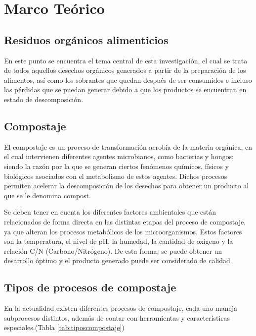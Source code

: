 \section{Marco Teórico}

\subsection{Residuos orgánicos alimenticios}

En este punto se encuentra el tema central de esta investigación, el cual se trata de todos aquellos desechos orgánicos generados a partir de la preparación de los alimentos, así como los sobrantes que quedan después de ser consumidos e incluso las pérdidas que se puedan generar debido a que los productos se encuentran en estado de descomposición. \cite{CCA2017}

\subsection{Compostaje}

El compostaje es un proceso de transformación aerobia de la materia orgánica, en el cual intervienen diferentes agentes microbianos, como bacterias y hongos; siendo la razón por la que se generan ciertos fenómenos químicos, físicos y biológicos asociados con el metabolismo de estos agentes. Dichos procesos permiten acelerar la descomposición de los desechos para obtener un producto al que se le denomina compost.

Se deben tener en cuenta los diferentes factores ambientales que están relacionados de forma directa en las distintas etapas del proceso de compostaje, ya que alteran los procesos metabólicos de los microorganismos. Estos factores son la temperatura, el nivel de pH, la humedad, la cantidad de oxígeno y la relación C/N (Carbono/Nitrógeno). De esta forma, se puede obtener un desarrollo óptimo y el producto generado puede ser considerado de calidad. \cite{WIL2019}

\subsection{Tipos de procesos de compostaje}

En la actualidad existen diferentes procesos de compostaje, cada uno maneja subprocesos distintos, además de contar con herramientas y características especiales.(Tabla \ref{tab:tiposcompostaje})

